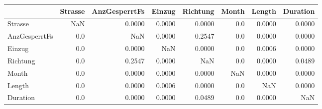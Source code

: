 \begin{tabular}{lrrrrrrr}
\toprule
{} &  Strasse &  AnzGesperrtFs &  Einzug &  Richtung &  Month &  Length &  Duration \\
\midrule
Strasse       &      NaN &         0.0000 &  0.0000 &    0.0000 &    0.0 &  0.0000 &    0.0000 \\
AnzGesperrtFs &      0.0 &            NaN &  0.0000 &    0.2547 &    0.0 &  0.0000 &    0.0000 \\
Einzug        &      0.0 &         0.0000 &     NaN &    0.0000 &    0.0 &  0.0006 &    0.0000 \\
Richtung      &      0.0 &         0.2547 &  0.0000 &       NaN &    0.0 &  0.0000 &    0.0489 \\
Month         &      0.0 &         0.0000 &  0.0000 &    0.0000 &    NaN &  0.0000 &    0.0000 \\
Length        &      0.0 &         0.0000 &  0.0006 &    0.0000 &    0.0 &     NaN &    0.0000 \\
Duration      &      0.0 &         0.0000 &  0.0000 &    0.0489 &    0.0 &  0.0000 &       NaN \\
\bottomrule
\end{tabular}
